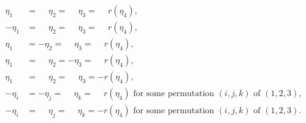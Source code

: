 \documentclass[reqno,english,11pt]{amsart}
\theoremstyle{definition}
\numberwithin{equation}{section}
\begin{document}
  \begin{subequations}
 \label{eqn:fam_2_subfam}
 \begin{align}
 \eta_{1}&=\phantom{-}\eta_{2}=\phantom{-}\eta_{3}=\phantom{-}r\left(\eta_4\right),\label{eqn:fam_2_a}
 \\
 -\eta_{1} &=\phantom{-} \eta_{2} =\phantom{-}\eta_{3}= \phantom{-}r\left(\eta_4\right),\label{eqn:fam_2_b}
 \\
 \eta_{1} &= -\eta_{2} =\phantom{-}\eta_{3}=\phantom{-}r\left(\eta_4\right),\label{eqn:fam_2_c}
 \\
  \eta_{1} &= \phantom{-}\eta_{2} =-\eta_{3}=\phantom{-}r\left(\eta_4\right),\label{eqn:fam_2_d}
 \\
 \eta_{1} &= \phantom{-}\eta_{2} =\phantom{-}\eta_{3} =- r\left(\eta_4\right),\label{eqn:fam_2_e}
  \\
 -\eta_{i} &= -\eta_{j} =\phantom{-}\eta_{k} = \phantom{-}r\left(\eta_4\right)\text{ for some permutation }(i,j,k)\text{ of } (1,2,3),\label{eqn:fam_2_f}
   \\
 -\eta_{i} &= \phantom{-} \eta_{j} =\phantom{-}\eta_{k} =- r\left(\eta_4\right)\text{ for some permutation }(i,j,k)\text{ of } (1,2,3).\label{eqn:fam_2_g}
 \end{align}
 \end{subequations}
 
\end{document}
